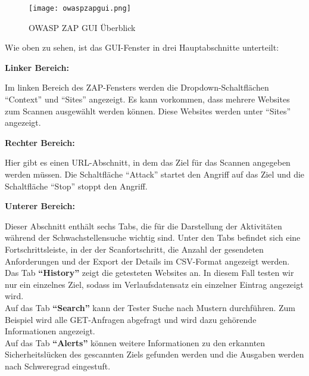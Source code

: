 \begin{figure}[h]
	\centering
	\texttt{[image: owaspzapgui.png]}
	\caption{OWASP ZAP GUI Überblick}
\end{figure}

Wie oben zu sehen, ist das GUI-Fenster in drei Hauptabschnitte unterteilt:\\

\begin{flushleft}
	\textbf{Linker Bereich:}\\
\end{flushleft}
Im linken Bereich des ZAP-Fensters werden die Dropdown-Schaltflächen "`Context"' und "`Sites"' angezeigt. Es kann vorkommen, dass mehrere Websites zum Scannen ausgewählt werden können. Diese Websites werden unter "`Sites"' angezeigt.

\begin{flushleft}
	\textbf{Rechter Bereich:}\\
\end{flushleft}
Hier gibt es einen URL-Abschnitt, in dem das Ziel für das Scannen angegeben werden müssen. Die Schaltfläche "`Attack"' startet den Angriff auf das Ziel und die Schaltfläche "`Stop"' stoppt den Angriff.

\begin{flushleft}
	\textbf{Unterer Bereich:}\\
\end{flushleft}
Dieser Abschnitt enthält sechs Tabs, die für die Darstellung der Aktivitäten während der Schwachstellensuche wichtig sind. Unter den Tabs befindet sich eine Fortschrittsleiste, in der der Scanfortschritt, die Anzahl der gesendeten Anforderungen und der Export der Details im CSV-Format angezeigt werden.\\

Das Tab \textbf{"`History"'} zeigt die getesteten Websites an. In diesem Fall testen wir nur ein einzelnes Ziel, sodass im Verlaufsdatensatz ein einzelner Eintrag angezeigt wird.\\

Auf das Tab \textbf{"`Search"'} kann der Tester Suche nach Mustern durchführen. Zum Beispiel wird alle GET-Anfragen abgefragt und wird dazu gehörende Informationen angezeigt.\\

Auf das Tab \textbf{"`Alerts"'} können weitere Informationen zu den erkannten Sicherheitslücken des gescannten Ziels gefunden werden und die Ausgaben werden nach Schweregrad eingestuft.\\

